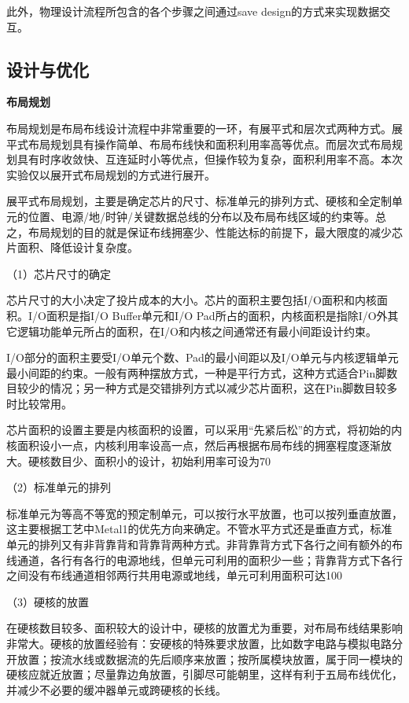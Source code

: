\documentclass[a4paper,12pt]{report}
\begin{document}
此外，物理设计流程所包含的各个步骤之间通过save design的方式来实现数据交互。
\subsection{设计与优化}
\noindent \textbf{布局规划}

布局规划是布局布线设计流程中非常重要的一环，有展平式和层次式两种方式。展平式布局规划具有操作简单、布局布线快和面积利用率高等优点。而层次式布局规划具有时序收敛快、互连延时小等优点，但操作较为复杂，面积利用率不高。本次实验仅以展开式布局规划的方式进行展开。

展平式布局规划，主要是确定芯片的尺寸、标准单元的排列方式、硬核和全定制单元的位置、电源/地/时钟/关键数据总线的分布以及布局布线区域的约束等。总之，布局规划的目的就是保证布线拥塞少、性能达标的前提下，最大限度的减少芯片面积、降低设计复杂度。

（1）芯片尺寸的确定

芯片尺寸的大小决定了投片成本的大小。芯片的面积主要包括I/O面积和内核面积。I/O面积是指I/O Buffer单元和I/O Pad所占的面积，内核面积是指除I/O外其它逻辑功能单元所占的面积，在I/O和内核之间通常还有最小间距设计约束。

I/O部分的面积主要受I/O单元个数、Pad的最小间距以及I/O单元与内核逻辑单元最小间距的约束。一般有两种摆放方式，一种是平行方式，这种方式适合Pin脚数目较少的情况；另一种方式是交错排列方式以减少芯片面积，这在Pin脚数目较多时比较常用。

芯片面积的设置主要是内核面积的设置，可以采用“先紧后松”的方式，将初始的内核面积设小一点，内核利用率设高一点，然后再根据布局布线的拥塞程度逐渐放大。硬核数目少、面积小的设计，初始利用率可设为70%

（2）标准单元的排列

标准单元为等高不等宽的预定制单元，可以按行水平放置，也可以按列垂直放置，这主要根据工艺中Metal1的优先方向来确定。不管水平方式还是垂直方式，标准单元的排列又有非背靠背和背靠背两种方式。非背靠背方式下各行之间有额外的布线通道，各行有各行的电源地线，但单元可利用的面积少一些；背靠背方式下各行之间没有布线通道相邻两行共用电源或地线，单元可利用面积可达100%

（3）硬核的放置

在硬核数目较多、面积较大的设计中，硬核的放置尤为重要，对布局布线结果影响非常大。硬核的放置经验有：安硬核的特殊要求放置，比如数字电路与模拟电路分开放置；按流水线或数据流的先后顺序来放置；按所属模块放置，属于同一模块的硬核应就近放置；尽量靠边角放置，引脚尽可能朝里，这样有利于五局布线优化，并减少不必要的缓冲器单元或跨硬核的长线。
\end{document}
